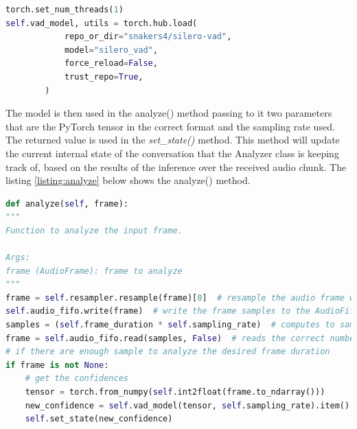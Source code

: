 \documentclass[../main.tex]{subfiles}
\begin{document}
\begin{lstlisting}[language=Python, caption=Silero VAD model load]
torch.set_num_threads(1)
self.vad_model, utils = torch.hub.load(
            repo_or_dir="snakers4/silero-vad",
            model="silero_vad",
            force_reload=False,
            trust_repo=True,
        )
\end{lstlisting}
\label{listing:model load}

The model is then used in the analyze() method passing to it two parameters that are the PyTorch tensor in the correct format and the sampling rate used. The returned value is used in the \textit{set\_state()} method. This method will update the current internal state of the conversation that the Analyzer class is keeping track of, based on the results of the inference over the received audio chunk. The listing \ref{listing:analyze} below shows the analyze() method.

\begin{lstlisting}[language=Python, caption={analyze() method}]
def analyze(self, frame):
"""
Function to analyze the input frame.

Args:
frame (AudioFrame): frame to analyze
"""
frame = self.resampler.resample(frame)[0]  # resample the audio frame with the selected sampling_rate
self.audio_fifo.write(frame)  # write the frame samples to the AudioFifo
samples = (self.frame_duration * self.sampling_rate)  # computes to samples to read needed for the specified frame duration
frame = self.audio_fifo.read(samples, False)  # reads the correct number of samples from the fifo
# if there are enough sample to analyze the desired frame duration
if frame is not None:
    # get the confidences
    tensor = torch.from_numpy(self.int2float(frame.to_ndarray())) 
    new_confidence = self.vad_model(tensor, self.sampling_rate).item()
    self.set_state(new_confidence)
\end{lstlisting}
\label{listing:analyze}
\end{document}
